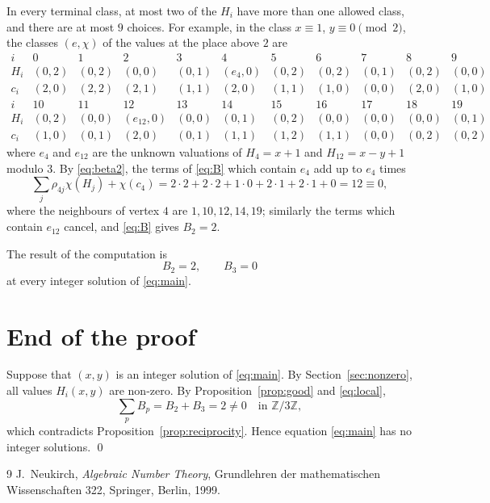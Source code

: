 \documentclass[11pt]{article}
\newcommand{\Z}{\mathbb{Z}}
\begin{document}
In every terminal class, at most two of the $H_i$ have more than one allowed class, and there are at most $9$ choices. For example, in the class $x\equiv1$, $y\equiv0\pmod2$, the classes $(e,\chi)$ of the values at the place above $2$ are
\[
\begin{array}{c|cccccccccc}
i&0&1&2&3&4&5&6&7&8&9\\\hline
H_i&(0,2)&(0,2)&(0,0)&(0,1)&(e_4,0)&(0,2)&(0,2)&(0,1)&(0,2)&(0,0)\\
c_i&(2,0)&(2,2)&(2,1)&(1,1)&(2,0)&(1,1)&(1,0)&(0,0)&(2,0)&(1,0)\\[4pt]
i&10&11&12&13&14&15&16&17&18&19\\\hline
H_i&(0,2)&(0,0)&(e_{12},0)&(0,0)&(0,1)&(0,2)&(0,0)&(0,0)&(0,0)&(0,1)\\
c_i&(1,0)&(0,1)&(2,0)&(0,1)&(1,1)&(1,2)&(1,1)&(0,0)&(0,2)&(0,2)
\end{array}
\]
where $e_4$ and $e_{12}$ are the unknown valuations of $H_4=x+1$ and $H_{12}=x-y+1$ modulo $3$. By \eqref{eq:beta2}, the terms of \eqref{eq:B} which contain $e_4$ add up to $e_4$ times
\[
\sum_j\rho_{4j}\chi(H_j)+\chi(c_4)=2\cdot2+2\cdot2+1\cdot0+2\cdot1+2\cdot1+0=12\equiv0,
\]
where the neighbours of vertex $4$ are $1,10,12,14,19$; similarly the terms which contain $e_{12}$ cancel, and \eqref{eq:B} gives $B_2=2$.

The result of the computation is
\begin{equation}\label{eq:local}
B_2=2,\qquad B_3=0
\end{equation}
at every integer solution of \eqref{eq:main}.


\section{End of the proof}

Suppose that $(x,y)$ is an integer solution of \eqref{eq:main}. By Section~\ref{sec:nonzero}, all values $H_i(x,y)$ are non-zero. By Proposition~\ref{prop:good} and \eqref{eq:local},
\[
\sum_pB_p=B_2+B_3=2\neq0\quad\text{in }\Z/3\Z,
\]
which contradicts Proposition~\ref{prop:reciprocity}. Hence equation \eqref{eq:main} has no integer solutions.
\qed

\begin{thebibliography}{9}
 J.~Neukirch, \emph{Algebraic Number Theory}, Grundlehren der mathematischen Wissenschaften 322, Springer, Berlin, 1999.
\end{thebibliography}
\end{document}
